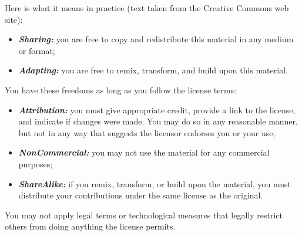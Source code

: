 Here is what it means in practice (text taken from the Creative Commons web site): 
{\small\begin{itemize}
	\item \textit{\textbf{Sharing:}} you are free to copy and redistribute this material in any medium or format;
	\item \textit{\textbf{Adapting:}} you are free to remix, transform, and build upon this material. 
\end{itemize}}
\noindent You have these freedoms as long as you follow the license terms:
{\small\begin{itemize}
	\item \textit{\textbf{Attribution:}}  you must give appropriate credit, provide a link to the license, and indicate if changes were made. You may do so in any reasonable manner, but not in any way that suggests the licensor endorses you or your use;
	\item \textit{\textbf{NonCommercial:}} you may not use the material for any commercial purposes;
	\item \textit{\textbf{ShareAlike:}} if you remix, transform, or build upon the material, you must distribute your contributions under the same license as the original.
\end{itemize}}
You may not apply legal terms or technological measures that legally restrict others from doing anything the license permits.





